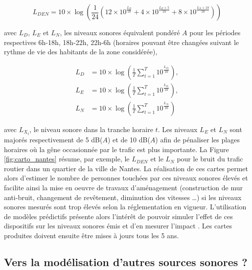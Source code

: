 \begin{equation}
L_{DEN} = 10\times\log \left(\frac{1}{24} \left(12\times10^{\frac{L_D}{10}}+4\times10^{\frac{L_E+5}{10}}+8\times10^{\frac{L_N+10}{10}} \right)\right)
\end{equation}

avec $L_D$, $L_E$ et $L_N$, les niveaux sonores équivalent pondéré $A$ pour les périodes respectives 6h-18h, 18h-22h, 22h-6h (horaires pouvant être changées suivant le rythme de vie des habitants de la zone considérée),

\begin{subequations}
\begin{align}
L_D &= 10\times\log\left(\frac{1}{T} \sum_{t = 1}^{T}10^{\frac{L_{D_t}}{10}}\right),\\
L_E &= 10\times\log\left(\frac{1}{T} \sum_{t = 1}^{T}10^{\frac{L_{E_t}}{10}}\right),\\
L_N &= 10\times\log\left(\frac{1}{T} \sum_{t = 1}^{T}10^{\frac{L_{N_t}}{10}}\right)
\end{align}
\end{subequations}

avec $L_{X_t}$, le niveau sonore dans la tranche horaire $t$. Les niveaux $L_E$ et $L_N$ sont majorés respectivement de 5 dB($A$) et de 10 dB($A$) afin de pénaliser les plages horaires où la gêne occasionnée par le trafic est plus importante. La Figure \ref{fig:carto_nantes} résume, par exemple, le $L_{DEN}$ et le $L_N$ pour le bruit du trafic routier dans un quartier de la ville de Nantes.
La réalisation de ces cartes permet alors d'estimer le nombre  de personnes touchées par ces niveaux sonores élevés et facilite ainsi la mise en oeuvre de travaux d'aménagement (construction de mur anti-bruit, changement de revêtement, diminution des vitesses \dots) si les niveaux sonores mesurés sont trop élevés selon la réglementation en vigueur. L'utilisation de modèles prédictifs présente alors l'intérêt de pouvoir simuler l'effet de ces dispositifs sur les niveaux sonores émis et d'en mesurer l'impact \cite{murphy2011scenario,guedes2011influence}. Les cartes produites doivent ensuite être mises à jours tous les 5 ans.


\subsection{Vers la modélisation d'autres sources sonores ?}

